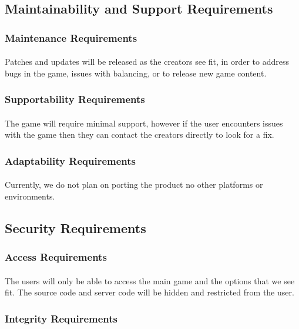 \documentclass[12pt, titlepage]{article}
\begin{document}
\subsection{Maintainability and Support Requirements}
\subsubsection{Maintenance Requirements}
\paragraph{}Patches and updates will be released as the creators see fit, in order to address bugs in the game, issues with balancing, or to release new game content. 
\subsubsection{Supportability Requirements}
\paragraph{}The game will require minimal support, however if the user encounters issues with the game then they can contact the creators directly to look for a fix. 
\subsubsection{Adaptability Requirements}
\paragraph{}Currently, we do not plan on porting the product no other platforms or environments.
\subsection{Security Requirements}
\subsubsection{Access Requirements}
\paragraph{}The users will only be able to access the main game and the options that we see fit. The source code and server code will be hidden and restricted from the user. 
\subsubsection{Integrity Requirements}
\end{document}
